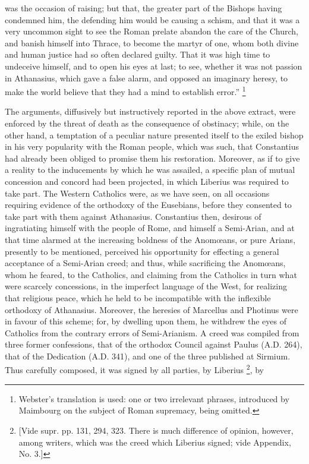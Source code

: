 was the occasion of raising; but that, the greater part of the Bishops
having condemned him, the defending him would be causing a schism, and
that it was a very uncommon sight to see the Roman prelate abandon the
care of the Church, and banish himself into Thrace, to become the
martyr of one, whom both divine and human justice had so often
declared guilty. That it was high time to undeceive himself, and to
open his eyes at last; to see, whether it was not passion in
Athanasius, which gave a false alarm, and opposed an imaginary heresy,
to make the world believe that they had a mind to establish
error.'' \footnote{Webster's translation is used: one or two
irrelevant phrases, introduced by Maimbourg on the subject of Roman
supremacy, being omitted.}

The arguments, diffusively but instructively reported in the above
extract, were enforced by the threat of death as the consequence of
obstinacy; while, on the other hand, a temptation of a peculiar nature
presented itself to the exiled bishop in his very popularity with the
Roman people, which was such, that Constantius had already been
obliged to promise them his restoration. Moreover, as if to give a
reality to the inducements by which he was assailed, a specific plan
of mutual concession and concord had been projected, in which Liberius
was required to take part. The Western Catholics were, as we
have seen, on all occasions requiring evidence of the orthodoxy of the
Eusebians, before they consented to take part with them against
Athanasius. Constantius then, desirous of ingratiating himself with
the people of Rome, and himself a Semi-Arian, and at that time alarmed
at the increasing boldness of the Anomœans, or pure Arians, presently
to be mentioned, perceived his opportunity for effecting a general
acceptance of a Semi-Arian creed; and thus, while sacrificing the
Anomœans, whom he feared, to the Catholics, and claiming from the
Catholics in turn what were scarcely concessions, in the imperfect
language of the West, for realizing that religious peace, which he
held to be incompatible with the inflexible orthodoxy of Athanasius.
Moreover, the heresies of Marcellus and Photinus were in favour of
this scheme; for, by dwelling upon them, he withdrew the eyes of
Catholics from the contrary errors of Semi-Arianism. A creed was
compiled from three former confessions, that of the orthodox Council
against Paulus (A.D. 264), that of the
Dedication (A.D. 341), and one of the three
published at Sirmium. Thus carefully composed, it was signed by all
parties, by Liberius \footnote{[Vide supr. pp. 131, 294, 323. There is much
difference of opinion, however, among writers, which was the creed
which Liberius signed; vide Appendix, No. 3.]}, by
